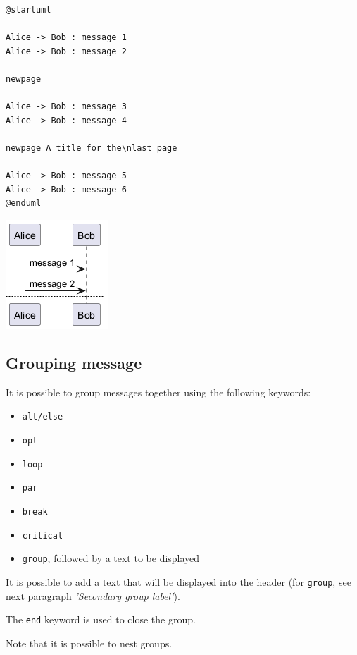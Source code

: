 \begin{verbatim}
@startuml

Alice -> Bob : message 1
Alice -> Bob : message 2

newpage

Alice -> Bob : message 3
Alice -> Bob : message 4

newpage A title for the\nlast page

Alice -> Bob : message 5
Alice -> Bob : message 6
@enduml
\end{verbatim}
\begin{center}
\includegraphics[scale=0.60]{imgw/img-7e4b767bed83a15e2ac03000a10fa162.png}
\end{center}


%
%
\subsection{Grouping message}




It is possible to group messages together using the following
keywords:
\begin{itemize}
\item \texttt{alt/else}
\item \texttt{opt}
\item \texttt{loop}
\item \texttt{par}
\item \texttt{break}
\item \texttt{critical}
\item \texttt{group}, followed by a text to be displayed
\end{itemize}




It is possible to add a text that will be displayed into the
header (for \texttt{group}, see next paragraph \textit{'Secondary group label'}).


The \texttt{end} keyword is used to close the group.


Note that it is possible to nest groups.


